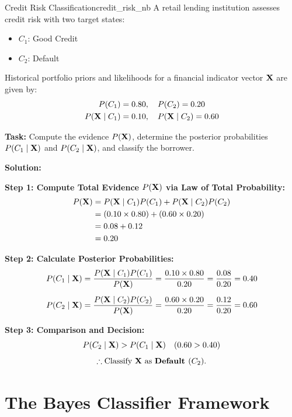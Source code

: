 \begin{example}{Credit Risk Classification}{credit_risk_nb}
A retail lending institution assesses credit risk with two target states:
\begin{itemize}[leftmargin=1.5em]
    \item $C_1$: Good Credit
    \item $C_2$: Default
\end{itemize}

\noindent Historical portfolio priors and likelihoods for a financial indicator vector $\mathbf{X}$ are given by:
\begin{align*}
P(C_1) &= 0.80, \quad P(C_2) = 0.20 \\
P(\mathbf{X} \mid C_1) &= 0.10, \quad P(\mathbf{X} \mid C_2) = 0.60
\end{align*}

\noindent\textbf{Task:} Compute the evidence $P(\mathbf{X})$, determine the posterior probabilities $P(C_1 \mid \mathbf{X})$ and $P(C_2 \mid \mathbf{X})$, and classify the borrower.

\tcblower
\textbf{Solution:}

\noindent\textbf{Step 1: Compute Total Evidence $P(\mathbf{X})$ via Law of Total Probability:}
\begin{align*}
P(\mathbf{X}) &= P(\mathbf{X} \mid C_1) P(C_1) + P(\mathbf{X} \mid C_2) P(C_2) \\
&= (0.10 \times 0.80) + (0.60 \times 0.20) \\
&= 0.08 + 0.12 \\
&= 0.20
\end{align*}

\noindent\textbf{Step 2: Calculate Posterior Probabilities:}
\begin{align*}
P(C_1 \mid \mathbf{X}) &= \frac{P(\mathbf{X} \mid C_1) P(C_1)}{P(\mathbf{X})} = \frac{0.10 \times 0.80}{0.20} = \frac{0.08}{0.20} = 0.40 \\[0.5em]
P(C_2 \mid \mathbf{X}) &= \frac{P(\mathbf{X} \mid C_2) P(C_2)}{P(\mathbf{X})} = \frac{0.60 \times 0.20}{0.20} = \frac{0.12}{0.20} = 0.60
\end{align*}

\noindent\textbf{Step 3: Comparison and Decision:}
$$P(C_2 \mid \mathbf{X}) > P(C_1 \mid \mathbf{X}) \quad (0.60 > 0.40)$$
$$\therefore \text{Classify } \mathbf{X} \text{ as } \textbf{Default } (C_2).$$
\end{example}

\section{The Bayes Classifier Framework}

